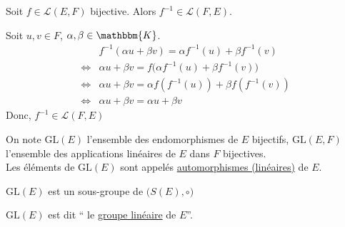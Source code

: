 \begin{prop}
	Soit $f \in \mathcal{L}(E,F)$ bijective. Alors $f^{-1} \in \mathcal{L}(F,E)$.
\end{prop}

\begin{prv}
	Soit $u,v\in F$, $\alpha, \beta \in \mathbbm{K}$.
	\begin{align*}
		&f^{-1}(\alpha u + \beta v) = \alpha f^{-1}(u) + \beta f^{-1}(v)\\
		\iff& \alpha u + \beta v = f\big(\alpha f^{-1}(u) + \beta f^{-1}(v)\big)\\
		\iff& \alpha u + \beta v = \alpha f\left( f^{-1}(u) \right) + \beta f\left( f^{-1}(v) \right) \\
		\iff& \alpha u + \beta v = \alpha u + \beta v
	\end{align*}
	Donc, $f^{-1} \in \mathcal{L}(F,E)$
\end{prv}

\begin{rmk}
	[Notation]
	On note $\mathrm{GL}(E)$ l'ensemble des endomorphismes de $E$ bijectifs, $\mathrm{GL}(E,F)$ l'ensemble des applications linéaires de $E$ dans $F$ bijectives.\\
	Les éléments de $\mathrm{GL}(E)$ sont appelés \underline{automorphismes (linéaires)} de $E$.
\end{rmk}

\begin{crlr}
	$\mathrm{GL}(E)$ est un sous-groupe de $\big(S(E),  \circ\big)$
\end{crlr}

\begin{defn}
	$\mathrm{GL}(E)$ est dit `` le \underline{groupe linéaire} de $E$''.
\end{defn}
